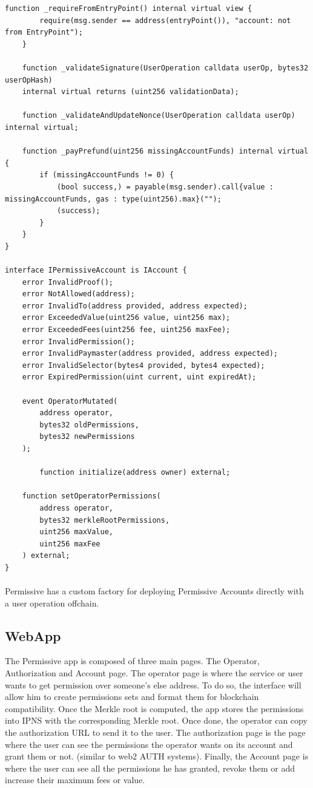 \documentclass{article}
\begin{document}
\begin{lstlisting}[language=Solidity]
    function _requireFromEntryPoint() internal virtual view {
        require(msg.sender == address(entryPoint()), "account: not from EntryPoint");
    }

    function _validateSignature(UserOperation calldata userOp, bytes32 userOpHash)
    internal virtual returns (uint256 validationData);

    function _validateAndUpdateNonce(UserOperation calldata userOp) internal virtual;

    function _payPrefund(uint256 missingAccountFunds) internal virtual {
        if (missingAccountFunds != 0) {
            (bool success,) = payable(msg.sender).call{value : missingAccountFunds, gas : type(uint256).max}("");
            (success);
        }
    }
}

interface IPermissiveAccount is IAccount {
    error InvalidProof();
    error NotAllowed(address);
    error InvalidTo(address provided, address expected);
    error ExceededValue(uint256 value, uint256 max);
    error ExceededFees(uint256 fee, uint256 maxFee);
    error InvalidPermission();
    error InvalidPaymaster(address provided, address expected);
    error InvalidSelector(bytes4 provided, bytes4 expected);
    error ExpiredPermission(uint current, uint expiredAt);

    event OperatorMutated(
        address operator,
        bytes32 oldPermissions,
        bytes32 newPermissions
    );

		function initialize(address owner) external;

    function setOperatorPermissions(
        address operator,
        bytes32 merkleRootPermissions,
        uint256 maxValue,
        uint256 maxFee
    ) external;
}
\end{lstlisting}
\paragraph{}
Permissive has a custom factory for deploying Permissive Accounts directly with a user operation offchain.
\subsection{WebApp}
The Permissive app is composed of three main pages. The Operator, Authorization and Account page. The operator page is where the service or user wants to get permission over someone’s else address. To do so, the interface will allow him to create permissions sets and format them for blockchain compatibility. Once the Merkle root is computed, the app stores the permissions into IPNS with the corresponding Merkle root. Once done, the operator can copy the authorization URL to send it to the user.  The authorization page is the page where the user can see the permissions the operator wants on its account and grant them or not. (similar to web2 AUTH systems). Finally, the Account page is where the user can see all the permissions he has granted, revoke them or add increase their maximum fees or value.
\end{document}
